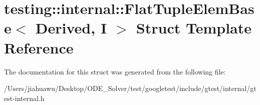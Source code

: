 \hypertarget{structtesting_1_1internal_1_1_flat_tuple_elem_base}{}\section{testing\+:\+:internal\+:\+:Flat\+Tuple\+Elem\+Base$<$ Derived, I $>$ Struct Template Reference}
\label{structtesting_1_1internal_1_1_flat_tuple_elem_base}


The documentation for this struct was generated from the following file\+:\begin{DoxyCompactItemize}
\item 
/\+Users/jiahuawu/\+Desktop/\+O\+D\+E\+\_\+\+Solver/test/googletest/include/gtest/internal/gtest-\/internal.\+h\end{DoxyCompactItemize}
